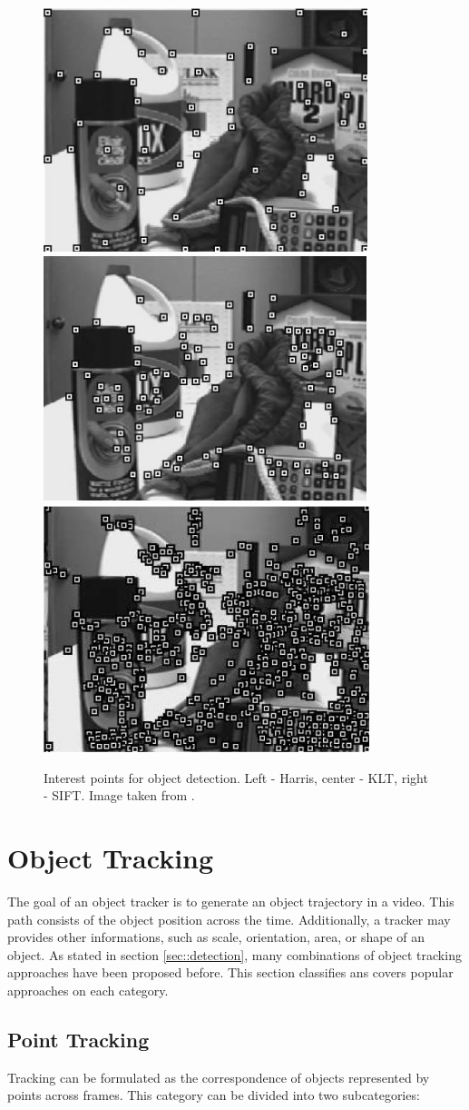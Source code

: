 \begin{figure}[h!!]
\centering
{
\includegraphics[width=0.32\linewidth]{Figures/points/harris.png}
\includegraphics[width=0.32\linewidth]{Figures/points/klt.png}
\includegraphics[width=0.32\linewidth]{Figures/points/sift.png}
}	
\caption[Interest points for object detection]
		{Interest points for object detection. Left - Harris, center - KLT, 
		right - SIFT. Image taken from \cite{Yilmaz2006}.}
\end{figure}

\section{Object Tracking}
\label{sec::tracking}

The goal of an object tracker is to generate an object trajectory in a video.
This path consists of the object position across the time. Additionally,
a tracker may provides other informations, such as scale, orientation, area, or
shape of an object. As stated in section \ref{sec::detection}, many combinations
of object tracking approaches have been proposed before. This section classifies
ans covers popular approaches on each category.

\subsection{Point Tracking}

Tracking can be formulated as the correspondence of objects represented by
points across frames. This category can be divided into two subcategories:

